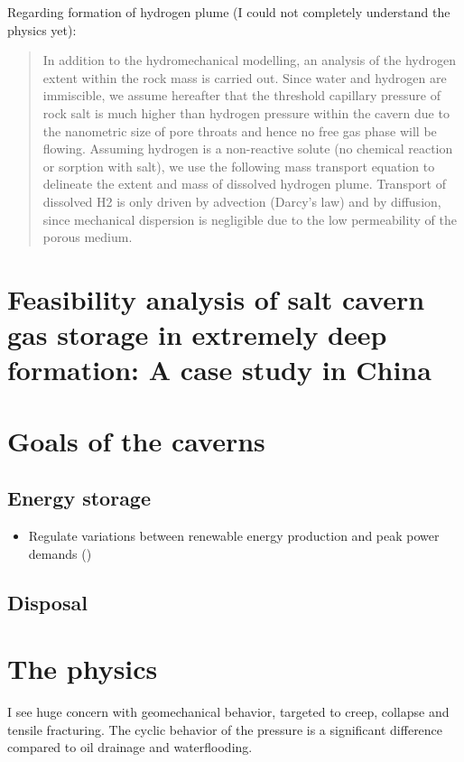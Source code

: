 \documentclass[a4paper]{article}
\begin{document}
Regarding formation of hydrogen plume (I could not completely understand the physics yet):
\begin{quote}
In addition to the hydromechanical modelling, an analysis of the
hydrogen extent within the rock mass is carried out. Since water and
hydrogen are immiscible, we assume hereafter that the threshold
capillary pressure of rock salt is much higher than hydrogen pressure
within the cavern due to the nanometric size of pore throats and hence
no free gas phase will be flowing. Assuming hydrogen is a non-reactive
solute (no chemical reaction or sorption with salt), we use the following
mass transport equation to delineate the extent and mass of dissolved
hydrogen plume. Transport of dissolved H2 is only driven by advection
(Darcy’s law) and by diffusion, since mechanical dispersion is negligible
due to the low permeability of the porous medium.
\end{quote}

\section{\cite{zhao22} Feasibility analysis of salt cavern gas storage in extremely deep formation: A case study in China}



\section{Goals of the caverns}
\subsection{Energy storage}
\begin{itemize}
\item Regulate variations between renewable energy production and peak power demands (\cite{coarita23})
\end{itemize}

\subsection{Disposal}

\section{The physics}

I see huge concern with geomechanical behavior, targeted to creep, collapse and tensile fracturing. The cyclic behavior of the pressure is a significant difference compared to oil drainage and waterflooding.
\end{document}
